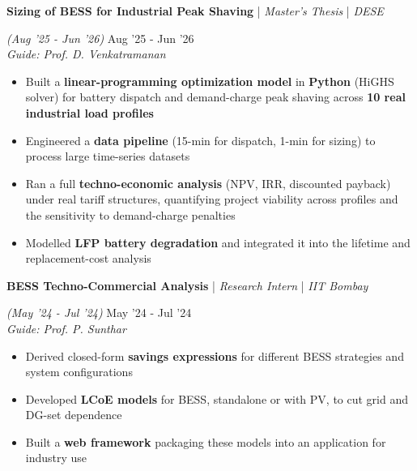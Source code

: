 \documentclass[10pt]{article}
\newcommand{\xfill}[2][1ex]{
	\dimen0=#2\advance\dimen0 by #1
	\leaders\hrule height \dimen0 depth -#1\hfill
}
\renewcommand{\section}[1]{
	\vspace{4pt}
	{\color{RoyalBlue}{\Large\scshape\raggedright #1\xfill[0pt]{0.5pt}}}
}
\renewcommand{\subsection}[5]{
	\def\temp{#4}
	\vspace{2pt}
	{
		\large
		{\textbf{#1}} | {\sl #2} | {\sl #3} \filldate{#4}
		\ifx\temp\empty
		\else
		{
			\\[0.1em]
			\fontsize{11}{13.2}\selectfont
			\sl #5
		}
		\fi
	}
}
\newcommand{\filldate}[1]{\strut\hfill {\small \textit{(#1)}}}
\begin{document}
\subsection{Sizing of BESS for Industrial Peak Shaving}{Master's Thesis}{DESE}{Aug '25 - Jun '26}{Guide: Prof. D. Venkatramanan}
\begin{itemize}
	\item Built a \textbf{linear-programming optimization model} in \textbf{Python} (HiGHS solver) for battery dispatch and demand-charge peak shaving across \textbf{10 real industrial load profiles}
	\item Engineered a \textbf{data pipeline} (15-min for dispatch, 1-min for sizing) to process large time-series datasets
	\item Ran a full \textbf{techno-economic analysis} (NPV, IRR, discounted payback) under real tariff structures, quantifying project viability across profiles and the sensitivity to demand-charge penalties
	\item Modelled \textbf{LFP battery degradation} and integrated it into the lifetime and replacement-cost analysis
\end{itemize}

\section{Professional Experience}

\subsection{BESS Techno-Commercial Analysis}{Research Intern}{IIT Bombay}{May '24 - Jul '24}{Guide: Prof. P. Sunthar}
\begin{itemize}
	\item Derived closed-form \textbf{savings expressions} for different BESS strategies and system configurations
	\item Developed \textbf{LCoE models} for BESS, standalone or with PV, to cut grid and DG-set dependence
	\item Built a \textbf{web framework} packaging these models into an application for industry use
\end{itemize}

\section{Key Projects}
\end{document}
